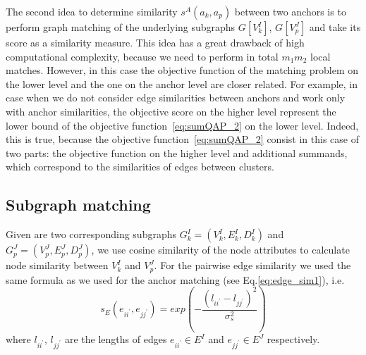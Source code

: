 The second idea to determine similarity $s^A(a_k, a_p)$ between two anchors is to perform graph matching of the underlying subgraphs $G[V^I_k]$, $G[V^J_p]$ and take its score as a similarity measure. This idea has a great drawback of high computational complexity, because we need to perform in total $m_1m_2$ local matches. However, in this case the objective function of the matching problem on the lower level and the one on the anchor level are closer related. For example, in case when we do not consider edge similarities between anchors and work only with anchor similarities, the objective score on the higher level represent the lower bound of the objective function~\eqref{eq:sumQAP_2} on the lower level.  %
Indeed, this is true, because the objective function~\eqref{eq:sumQAP_2} consist in this case of two parts: the objective function on the higher level and additional summands, which correspond to the similarities of edges between clusters.
\subsection{Subgraph matching}
Given are two corresponding subgraphs $G^I_{k}=(V^I_{k},E^I_{k},D^I_{k})$ and $G^J_{p}=(V^J_{p},E^J_{p},D^J_{p})$, we use cosine similarity of the node attributes to calculate node similarity between $V^I_{k}$ and $V^J_{p}$. For the pairwise edge similarity we used the same formula as we used for the anchor matching (see Eq.\eqref{eq:edge_sim1}), i.e.\ 
\begin{equation}\label{eq:edge_sim1_2}
s_E(e_{ii^\prime}, e_{jj^\prime}) = exp(-\frac{(l_{ii^\prime} - l_{jj^\prime})^2}{\sigma^2_{s}})
\end{equation}
where $l_{ii^\prime}$, $l_{jj^\prime} $ are the lengths of edges $e_{ii^\prime}\in E^I$ and $e_{jj^\prime}\in E^J$ respectively.


